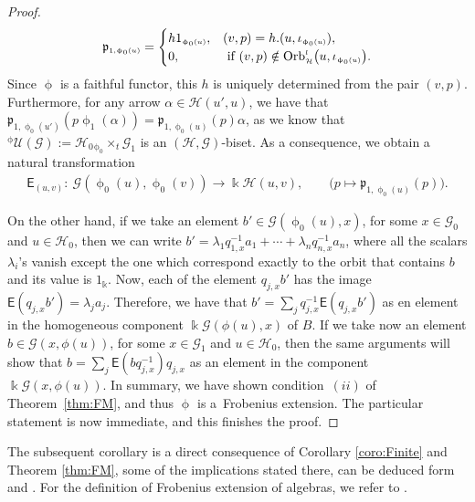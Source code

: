 \documentclass[pdftex]{sigma}
\numberwithin{equation}{section}
\newcommand{\Sf}[1]{\mathsf{#1}}
\newcommand{\fk}[1]{\mathfrak{#1}}
\newcommand{\Go}{\cG_{\Sscript{0}}}
\newcommand{\Ga}{\cG_{\Sscript{1}}}
\newcommand{\Ho}{\cH_{\Sscript{0}}}
\newcommand{\Orbit}[2]{{{\rm Orb}}_{\Sscript{\mathcal{#2}}}^{\Sscript{l}}\big(
#1 \big)}
\newcommand{\uU}{\mathscr{U}}
\newcommand{\cG}{{\mathcal G}}
\newcommand{\cH}{{\mathcal H}}
\newcommand{\Sscript}[1]{\scriptscriptstyle{#1}}
\newcommand{\due}[3]{{}_{{#2 }} {#1}_{{ #3}} }
\newcommand{\phio}{\upphi_{\Sscript{0}}}
\newcommand{\phia}{\upphi_{\Sscript{1}}}
\begin{document}
\begin{proof}
\begin{gather*}
\fk{p}_{\Sscript{1, \phio(u)}} = \begin{cases} h 1_{\Sscript{\phio(u)}}, & (v,p) = h . (u,\iota_{\Sscript{\phio(u)}}), \\ 0, & \text{ if } (v,p) \notin \Orbit{u, \iota_{\Sscript{\phio(u)}}}{H}. \end{cases}
\end{gather*}
Since $\upphi$ is a faithful functor, this $h$ is uniquely determined from the pair $(v,p)$. Furthermore, for any arrow $\alpha \in \cH(u',u)$, we have that $\fk{p}_{\Sscript{1,\phio(u')}} (p \phia(\alpha)) = \fk{p}_{\Sscript{1, \phio(u)}}(p) \alpha$, as we know that ${}^{\Sscript{\upphi}}\uU(\cG):=\Ho \due \times {\Sscript{\upphi_0}}{ \Sscript{t}} \Ga$ is an $(\cH,\cG)$-biset. As a consequence, we obtain a natural transformation
\begin{gather*}
\Sf{E}_{\Sscript{(u, v)}}\colon \ \cG(\phio(u), \phio(v)) \longrightarrow \Bbbk\cH(u,v), \qquad \big( p \longmapsto \fk{p}_{\Sscript{1, \phio(u)}}(p) \big).
\end{gather*}

 On the other hand, if we take an element $b' \in \cG(\phio(u), x)$, for some $x \in \Go$ and $u \in \Ho$, then we can write $b'= \lambda_{\Sscript{1}} q_{\Sscript{1, x}}^{-1} a_{\Sscript{1}} + \cdots + \lambda_{\Sscript{n}} q_{\Sscript{n, x}}^{-1} a_{\Sscript{n}}$, where all the scalars $\lambda_{\Sscript{i}}$'s vanish except the one which correspond exactly to the orbit that contains $b$ and its value is $1_{\Sscript{\Bbbk}}$. Now, each of the element $q_{\Sscript{j, x}} b'$ has the image $\Sf{E}(q_{\Sscript{j, x}} b') = \lambda_{\Sscript{j}} a_{\Sscript{j}}$. Therefore, we have that $b' =\sum_j q_{\Sscript{j, x}}^{-1} \Sf{E}(q_{\Sscript{j, x}} b')$ as en element in the homogeneous component $\Bbbk \cG(\phi(u), x)$ of $B$. If we take now an element $b \in \cG(x,\phi(u))$, for some $x \in \Ga$ and $u \in \Ho$, then the same arguments will show that $ b = \sum_j \Sf{E}(bq_{\Sscript{j, x}}^{-1}) q_{\Sscript{j, x}}$ as an element in the component $\Bbbk \cG(x,\phi(u))$. In summary, we have shown condition~$(ii)$ of Theorem~\ref{thm:FM}, and thus $\upphi$ is a~Frobenius extension. The particular statement is now immediate, and this finishes the proof.
\end{proof}

The subsequent corollary is a direct consequence of Corollary \ref{coro:Finite} and Theorem \ref{thm:FM}, some of the implications stated there, can be deduced form \cite[Example~1.7] {Kadison:1999} and \cite[pp.~36, 39]{Kowalski:2014}. For the definition of Frobenius extension of algebras, we refer to \cite[Definition 1.1] {Kadison:1999}.
\end{document}
